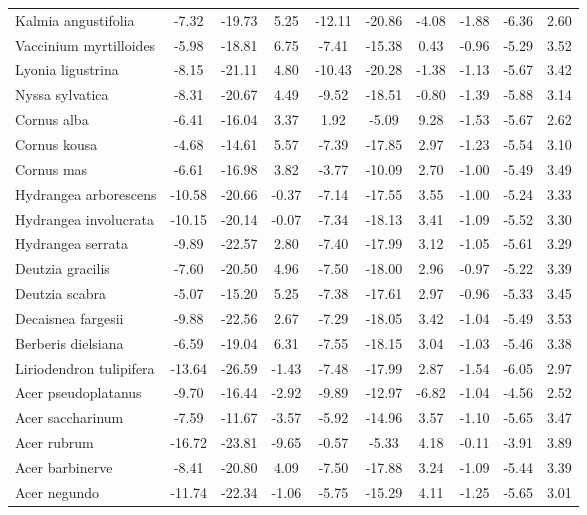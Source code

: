 \documentclass[11pt]{article}
\begin{document}
\begin{longtable}{p{1.50in}c{0.32in}c{0.32in}c{0.32in}c{0.32in}c{0.32in}c{0.32in}c{0.2in}c{0.3in}c{0.1in}}
  Kalmia angustifolia & -7.32 & -19.73 & 5.25 & -12.11 & -20.86 & -4.08 & -1.88 & -6.36 & 2.60 \\ 
  Vaccinium myrtilloides & -5.98 & -18.81 & 6.75 & -7.41 & -15.38 & 0.43 & -0.96 & -5.29 & 3.52 \\ 
  Lyonia ligustrina & -8.15 & -21.11 & 4.80 & -10.43 & -20.28 & -1.38 & -1.13 & -5.67 & 3.42 \\ 
  Nyssa sylvatica & -8.31 & -20.67 & 4.49 & -9.52 & -18.51 & -0.80 & -1.39 & -5.88 & 3.14 \\ 
  Cornus alba & -6.41 & -16.04 & 3.37 & 1.92 & -5.09 & 9.28 & -1.53 & -5.67 & 2.62 \\ 
  Cornus kousa & -4.68 & -14.61 & 5.57 & -7.39 & -17.85 & 2.97 & -1.23 & -5.54 & 3.10 \\ 
  Cornus mas & -6.61 & -16.98 & 3.82 & -3.77 & -10.09 & 2.70 & -1.00 & -5.49 & 3.49 \\ 
  Hydrangea arborescens & -10.58 & -20.66 & -0.37 & -7.14 & -17.55 & 3.55 & -1.00 & -5.24 & 3.33 \\ 
  Hydrangea involucrata & -10.15 & -20.14 & -0.07 & -7.34 & -18.13 & 3.41 & -1.09 & -5.52 & 3.30 \\ 
  Hydrangea serrata & -9.89 & -22.57 & 2.80 & -7.40 & -17.99 & 3.12 & -1.05 & -5.61 & 3.29 \\ 
  Deutzia gracilis & -7.60 & -20.50 & 4.96 & -7.50 & -18.00 & 2.96 & -0.97 & -5.22 & 3.39 \\ 
  Deutzia scabra & -5.07 & -15.20 & 5.25 & -7.38 & -17.61 & 2.97 & -0.96 & -5.33 & 3.45 \\ 
  Decaisnea fargesii & -9.88 & -22.56 & 2.67 & -7.29 & -18.05 & 3.42 & -1.04 & -5.49 & 3.53 \\ 
  Berberis dielsiana & -6.59 & -19.04 & 6.31 & -7.55 & -18.15 & 3.04 & -1.03 & -5.46 & 3.38 \\ 
  Liriodendron tulipifera & -13.64 & -26.59 & -1.43 & -7.48 & -17.99 & 2.87 & -1.54 & -6.05 & 2.97 \\ 
  Acer pseudoplatanus & -9.70 & -16.44 & -2.92 & -9.89 & -12.97 & -6.82 & -1.04 & -4.56 & 2.52 \\ 
  Acer saccharinum & -7.59 & -11.67 & -3.57 & -5.92 & -14.96 & 3.57 & -1.10 & -5.65 & 3.47 \\ 
  Acer rubrum & -16.72 & -23.81 & -9.65 & -0.57 & -5.33 & 4.18 & -0.11 & -3.91 & 3.89 \\ 
  Acer barbinerve & -8.41 & -20.80 & 4.09 & -7.50 & -17.88 & 3.24 & -1.09 & -5.44 & 3.39 \\ 
  Acer negundo & -11.74 & -22.34 & -1.06 & -5.75 & -15.29 & 4.11 & -1.25 & -5.65 & 3.01 \\ 

\end{longtable}
\end{document}
